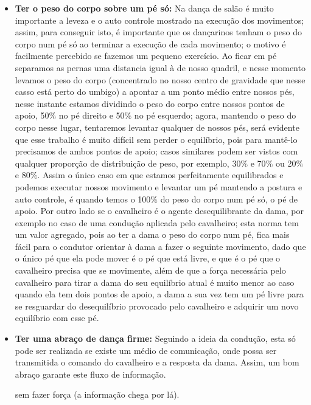 \begin{itemize}
\item \textbf{Ter o peso do corpo sobre um pé só:} 
Na dança de salão é muito importante a leveza e o auto controle mostrado na 
execução dos movimentos; assim, para conseguir isto, é importante que os dançarinos
tenham o peso do corpo num pé só ao terminar a execução de cada movimento; o motivo
é facilmente percebido se fazemos um pequeno exercício. Ao ficar em pé separamos as
pernas uma distancia igual à de nosso quadril, e nesse momento levamos o peso do corpo
(concentrado no nosso centro de gravidade que nesse casso está perto do umbigo) a
apontar a um ponto médio entre nossos pés, nesse instante estamos dividindo o peso do corpo
entre nossos pontos de apoio, 50$\%$ no pé direito e 50$\%$ no pé esquerdo; agora, mantendo o peso
do corpo nesse lugar, tentaremos levantar qualquer de nossos pés, será evidente
que esse trabalho é muito difícil sem perder o equilíbrio, pois para mantê-lo
precisamos de ambos pontos de apoio; casos similares podem ser vistos com qualquer proporção de distribuição de peso,
por exemplo, 30$\%$ e 70$\%$ ou 20$\%$ e 80$\%$. Assim o único caso em que estamos
perfeitamente equilibrados e podemos executar nossos movimento e levantar um pé 
mantendo a postura e auto controle, é quando
temos o 100$\%$ do peso do corpo num pé só, o pé de apoio. 
Por outro lado se o cavalheiro é  o agente desequilibrante da dama, por exemplo no caso
de uma condução aplicada pelo cavalheiro;
esta norma tem um valor agregado, pois ao ter a dama o peso do corpo num pé, 
fica mais fácil para o condutor orientar
à dama a fazer o seguinte movimento, dado que o único pé que ela pode mover é o pé
que está livre, e que é o pé que o cavalheiro precisa que se movimente, 
além de que a força necessária pelo cavalheiro para tirar a dama do seu equilíbrio 
atual é muito menor ao caso quando ela tem dois pontos de apoio, a dama 
a sua vez tem um pé livre para se resguardar do desequilíbrio provocado pelo 
cavalheiro e adquirir um novo equilíbrio com esse pé.

\item \textbf{Ter uma abraço de dança firme:} Seguindo a ideia da condução, esta só pode
ser realizada se existe um médio de comunicação, onde possa ser transmitida
o comando do cavalheiro e a resposta da dama. Assim, um bom abraço garante este
fluxo de informação.

sem fazer força (a informação chega por lá).
\end{itemize}

